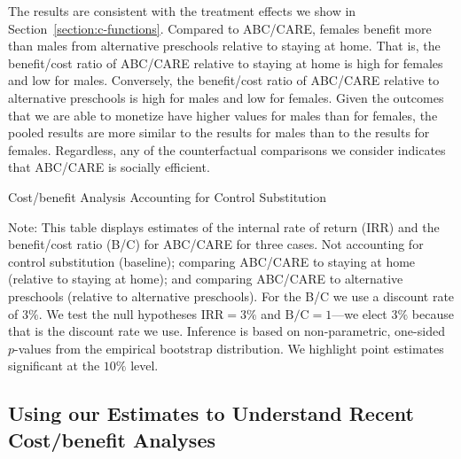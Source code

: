 The results are consistent with the treatment effects we show in Section~\ref{section:c-functions}. Compared to ABC/CARE, females benefit more than males from alternative preschools relative to staying at home. That is, the benefit/cost ratio of ABC/CARE relative to staying at home is high for females and low for males. Conversely, the benefit/cost ratio of ABC/CARE relative to alternative preschools is high for males and low for females. Given the outcomes that we are able to monetize have higher values for males than for females, the pooled results are more similar to the results for males than to the results for females. Regardless, any of the counterfactual comparisons we consider indicates that ABC/CARE is socially efficient.

\begin{table}[!htbp]
\begin{threeparttable}
\caption{Cost/benefit Analysis Accounting for Control Substitution}
\label{table:cbacs}
\centering

\begin{tablenotes}
\footnotesize
\item Note: This table displays estimates of the internal rate of return (IRR) and the benefit/cost ratio (B/C) for ABC/CARE for three cases. Not accounting for control substitution (baseline); comparing ABC/CARE to staying at home (relative to staying at home); and comparing ABC/CARE to alternative preschools (relative to alternative preschools). For the B/C we use a discount rate of $3\%$. We test the null hypotheses $\text{IRR} = 3\%$ and $\text{B/C} = 1$---we elect $3\%$ because that is the discount rate we use. Inference is based on non-parametric, one-sided $p$-values from the empirical bootstrap distribution. We highlight point estimates significant at the $10\%$ level.
\end{tablenotes}
\end{threeparttable}
\end{table}

\subsection{Using our Estimates to Understand Recent Cost/benefit Analyses}

